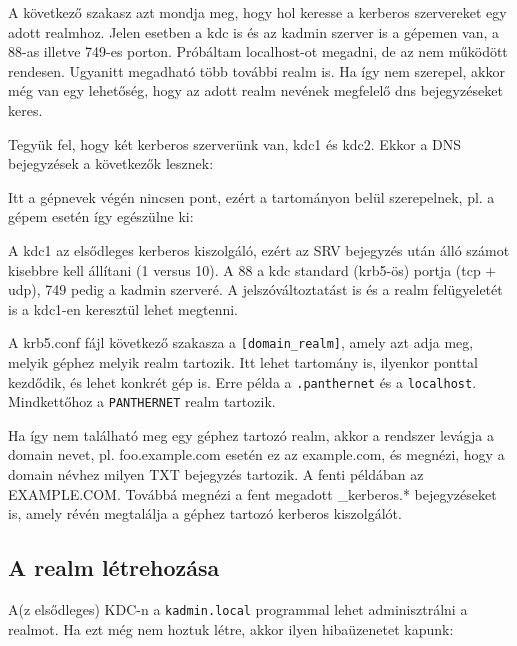 A következő szakasz azt mondja meg, hogy hol keresse a kerberos szervereket egy adott realmhoz. Jelen esetben a kdc is
és az kadmin szerver is a gépemen van, a 88-as illetve 749-es porton. Próbáltam localhost-ot megadni, de az nem
működött rendesen. Ugyanitt megadható több további realm is. Ha így nem szerepel, akkor még van egy lehetőség, hogy az
adott realm nevének megfelelő dns bejegyzéseket keres.

Tegyük fel, hogy két kerberos szerverünk van, kdc1 és kdc2. Ekkor a DNS bejegyzések a következők lesznek:


Itt a gépnevek végén nincsen pont, ezért a tartományon belül szerepelnek, pl. a gépem esetén így egészülne ki:\\

A kdc1 az elsődleges kerberos kiszolgáló, ezért az SRV bejegyzés után álló számot kisebbre kell állítani (1 versus
10). A 88 a kdc standard (krb5-ös) portja (tcp + udp), 749 pedig a kadmin szerveré. A jelszóváltoztatást is és a realm
felügyeletét is a kdc1-en keresztül lehet megtenni.

A krb5.conf fájl következő szakasza a \texttt{[domain\_realm]}, amely azt adja meg, melyik géphez melyik realm
tartozik. Itt lehet tartomány is, ilyenkor ponttal kezdődik, és lehet konkrét gép is. Erre példa a
\texttt{.panthernet} és a \texttt{localhost}. Mindkettőhoz a \texttt{PANTHERNET} realm tartozik.

Ha így nem található meg egy géphez tartozó realm, akkor a rendszer levágja a domain nevet, pl. foo.example.com esetén
ez az example.com, és megnézi, hogy a domain névhez milyen TXT bejegyzés tartozik. A fenti példában az
EXAMPLE.COM. Továbbá megnézi a fent megadott \_kerberos.* bejegyzéseket is, amely révén megtalálja a géphez tartozó
kerberos kiszolgálót.


\subsection{A realm létrehozása}
A(z elsődleges) KDC-n a \texttt{kadmin.local} programmal lehet adminisztrálni a realmot. Ha ezt még nem hoztuk létre,
akkor ilyen hibaüzenetet kapunk:

